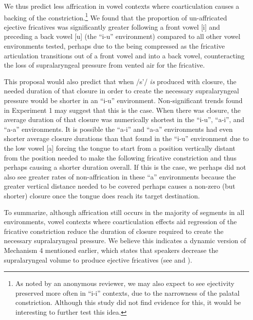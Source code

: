 \documentclass[output=paper
,newtxmath
,modfonts
,nonflat]{langsci/langscibook}
\begin{document}
We thus predict less affrication in vowel contexts where coarticulation causes a backing of the constriction.\footnote{As noted by an anonymous reviewer, we may also expect to see ejectivity preserved more often in “i-i” contexts, due to the narrowness of the palatal constriction. Although this study did not find evidence for this, it would be interesting to further test this idea.} We found that the proportion of un-affricated ejective fricatives was significantly greater following a front vowel [i] and preceding a back vowel [u] (the “i-u” environment) compared to all other vowel environments tested, perhaps due to the  being compressed as the fricative articulation transitions out of a front vowel and into a back vowel, counteracting the loss of supralaryngeal pressure from vented air for the fricative. 

This proposal would also predict that when /s’/ \textit{is} produced with closure, the needed duration of that closure in order to create the necessary supralaryngeal pressure would be shorter in an “i-u” environment. Non-significant trends found in Experiment 1 may suggest that this is the case. When there was closure, the average duration of that closure was numerically shortest in the “i-u”, “a-i”, and “a-a” environments. It is possible the “a-i” and “a-a” environments had even shorter average closure durations than that found in the “i-u” environment due to the low vowel [a] forcing the tongue to start from a position vertically distant from the position needed to make the following fricative constriction and thus perhaps causing a shorter duration overall. If this is the case, we perhaps did not also see greater rates of non-affrication in these “a” environments because the greater vertical distance needed to be covered perhaps causes a non-zero (but shorter) closure once the tongue does reach its target destination.

To summarize, although affrication still occurs in the majority of segments in all environments, vowel contexts where coarticulation effects aid regression of the fricative constriction reduce the duration of closure required to create the necessary supralaryngeal pressure. We believe this indicates a dynamic version of Mechanism 4 mentioned earlier, which states that speakers decrease the supralaryngeal volume to produce ejective fricatives (see  and \citealt{demolin2002search}).
\end{document}
